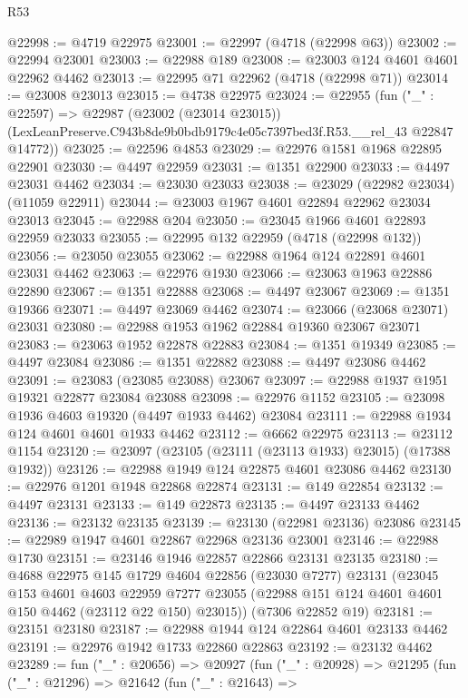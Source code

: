\begin{lexlean}{R53}
\begin{coremodule}
@22998 := @4719 @22975
@23001 := @22997 (@4718 (@22998 @63))
@23002 := @22994 @23001
@23003 := @22988 @189
@23008 := @23003 @124 @4601 @4601 @22962 @4462
@23013 := @22995 @71 @22962 (@4718 (@22998 @71))
@23014 := @23008 @23013
@23015 := @4738 @22975
@23024 := @22955
    (fun ("_" : @22597) =>
    @22987
      (@23002 (@23014 @23015))
      (LexLeanPreserve.C943b8de9b0bdb9179c4e05c7397bed3f.R53.__rel_43 @22847 @14772))
@23025 := @22596 @4853
@23029 := @22976 @1581 @1968 @22895 @22901
@23030 := @4497 @22959
@23031 := @1351 @22900
@23033 := @4497 @23031 @4462
@23034 := @23030 @23033
@23038 := @23029 (@22982 @23034) (@11059 @22911)
@23044 := @23003 @1967 @4601 @22894 @22962 @23034 @23013
@23045 := @22988 @204
@23050 := @23045 @1966 @4601 @22893 @22959 @23033
@23055 := @22995 @132 @22959 (@4718 (@22998 @132))
@23056 := @23050 @23055
@23062 := @22988 @1964 @124 @22891 @4601 @23031 @4462
@23063 := @22976 @1930
@23066 := @23063 @1963 @22886 @22890
@23067 := @1351 @22888
@23068 := @4497 @23067
@23069 := @1351 @19366
@23071 := @4497 @23069 @4462
@23074 := @23066 (@23068 @23071) @23031
@23080 := @22988 @1953 @1962 @22884 @19360 @23067 @23071
@23083 := @23063 @1952 @22878 @22883
@23084 := @1351 @19349
@23085 := @4497 @23084
@23086 := @1351 @22882
@23088 := @4497 @23086 @4462
@23091 := @23083 (@23085 @23088) @23067
@23097 := @22988 @1937 @1951 @19321 @22877 @23084 @23088
@23098 := @22976 @1152
@23105 := @23098 @1936 @4603 @19320 (@4497 @1933 @4462) @23084
@23111 := @22988 @1934 @124 @4601 @4601 @1933 @4462
@23112 := @6662 @22975
@23113 := @23112 @1154
@23120 := @23097 (@23105 (@23111 (@23113 @1933) @23015) (@17388 @1932))
@23126 := @22988 @1949 @124 @22875 @4601 @23086 @4462
@23130 := @22976 @1201 @1948 @22868 @22874
@23131 := @149 @22854
@23132 := @4497 @23131
@23133 := @149 @22873
@23135 := @4497 @23133 @4462
@23136 := @23132 @23135
@23139 := @23130 (@22981 @23136) @23086
@23145 := @22989 @1947 @4601 @22867 @22968 @23136 @23001
@23146 := @22988 @1730
@23151 := @23146 @1946 @22857 @22866 @23131 @23135
@23180 := @4688
    @22975
    @145
    @1729
    @4604
    @22856
    (@23030 @7277)
    @23131
    (@23045
      @153
      @4601
      @4603
      @22959
      @7277
      @23055
      (@22988 @151 @124 @4601 @4601 @150 @4462 (@23112 @22 @150) @23015))
    (@7306 @22852 @19)
@23181 := @23151 @23180
@23187 := @22988 @1944 @124 @22864 @4601 @23133 @4462
@23191 := @22976 @1942 @1733 @22860 @22863
@23192 := @23132 @4462
@23289 := fun ("_" : @20656) =>
  @20927
    (fun ("_" : @20928) =>
    @21295
      (fun ("_" : @21296) =>
      @21642
        (fun ("_" : @21643) =>

\end{coremodule}
\end{lexlean}
